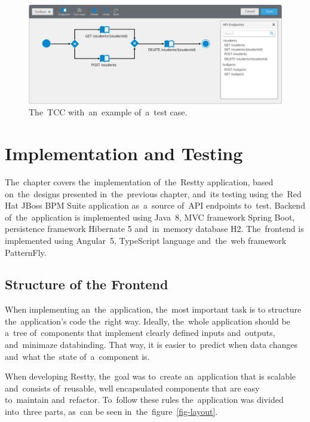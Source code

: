 \begin{figure}[!hbt]
	\centering
	\includegraphics[scale=0.65]{./designs/test-case.pdf}
	\caption{The~TCC with~an~example of~a~test case.}
	\label{fig-test-case}
\end{figure}






\chapter{Implementation and Testing}
The~chapter covers the~implementation of~the~Restty application, based on~the~designs presented
in~the~previous chapter, and~its testing using the~Red Hat JBoss BPM Suite application as~a~source
of~API endpoints to~test. Backend of~the~application is implemented using Java~8, MVC framework
Spring Boot, persistence framework Hibernate 5 and~in~memory database H2. The~frontend is implemented using
Angular~5, TypeScript language and~the~web framework PatternFly.

\section{Structure of the Frontend}
When implementing an~the~application, the~most important task is to structure the~application's code
the~right way. Ideally, the~whole application should be a~tree of~components that implement clearly
defined inputs and~outputs, and~minimaze  databinding. That way, it is easier to~predict
when data changes and~what the~state of~a~component is.

When developing Restty, the~goal was to~create an~application that is scalable and~consists
of~reusable, well encapsulated components that are easy to~maintain and~refactor. To~follow these
rules the~application was divided into~three parts, as~can be seen in~the~figure~\ref{fig-layout}.

